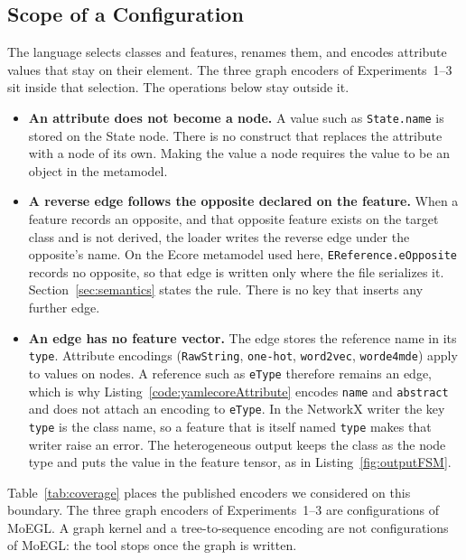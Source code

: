 \documentclass[journal,article,submit,moreauthors,technologies]{Definitions/mdpi}
\newcommand{\rev}[1]{#1}
\begin{document}
\subsection{\rev{Scope of a Configuration}}\label{sec:limits}
\rev{The language selects classes and features, renames them, and encodes attribute values that stay on their element. The three graph encoders of Experiments~1--3 sit inside that selection. The operations below stay outside it.}
\begin{itemize}
    \item \rev{\textbf{An attribute does not become a node.} A value such as \texttt{State.name} is stored on the State node. There is no construct that replaces the attribute with a node of its own. Making the value a node requires the value to be an object in the metamodel.}
    \item \rev{\textbf{A reverse edge follows the opposite declared on the feature.} When a feature records an opposite, and that opposite feature exists on the target class and is not derived, the loader writes the reverse edge under the opposite's name. On the Ecore metamodel used here, \texttt{EReference.eOpposite} records no opposite, so that edge is written only where the file serializes it. Section~\ref{sec:semantics} states the rule. There is no key that inserts any further edge.}
    \item \rev{\textbf{An edge has no feature vector.} The edge stores the reference name in its \texttt{type}. Attribute encodings (\texttt{RawString}, \texttt{one-hot}, \texttt{word2vec}, \texttt{worde4mde}) apply to values on nodes. A reference such as \texttt{eType} therefore remains an edge, which is why Listing~\ref{code:yamlecoreAttribute} encodes \texttt{name} and \texttt{abstract} and does not attach an encoding to \texttt{eType}. In the NetworkX writer the key \texttt{type} is the class name, so a feature that is itself named \texttt{type} makes that writer raise an error. The heterogeneous output keeps the class as the node type and puts the value in the feature tensor, as in Listing~\ref{fig:outputFSM}.}
\end{itemize}
\rev{Table~\ref{tab:coverage} places the published encoders we considered on this boundary. The three graph encoders of Experiments~1--3 are configurations of MoEGL. A graph kernel and a tree-to-sequence encoding are not configurations of MoEGL: the tool stops once the graph is written.}
\end{document}
